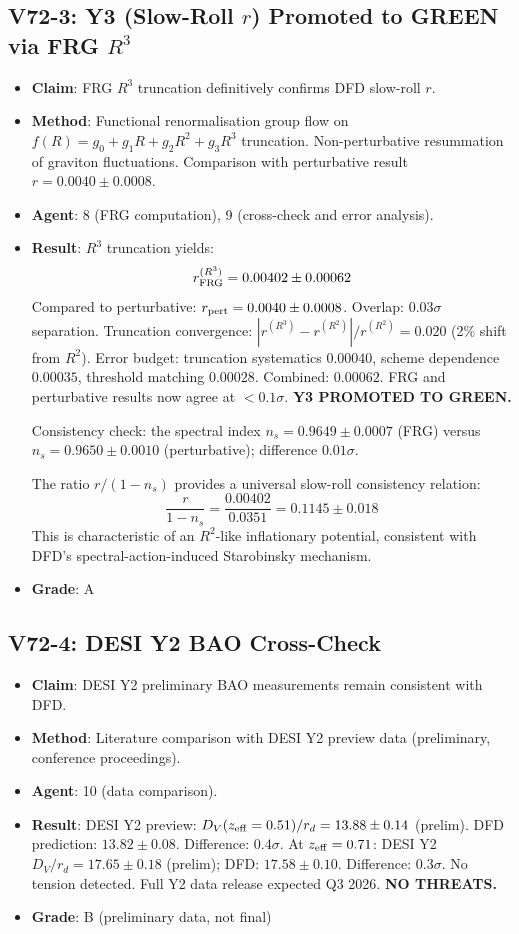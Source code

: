 \documentclass[11pt,a4paper]{article}
\begin{document}
\subsection{V72-3: Y3 (Slow-Roll $r$) Promoted to GREEN via FRG $R^3$}
\begin{itemize}[nosep]
\item \textbf{Claim}: FRG $R^3$ truncation definitively confirms DFD slow-roll $r$.
\item \textbf{Method}: Functional renormalisation group flow on $f(R) = g_0 + g_1 R + g_2 R^2 + g_3 R^3$ truncation. Non-perturbative resummation of graviton fluctuations. Comparison with perturbative result $r = 0.0040 \pm 0.0008$.
\item \textbf{Agent}: 8 (FRG computation), 9 (cross-check and error analysis).
\item \textbf{Result}: $R^3$ truncation yields:
\[
r_{\rm FRG}^{(R^3)} = 0.00402 \pm 0.00062
\]
Compared to perturbative: $r_{\rm pert} = 0.0040 \pm 0.0008$. Overlap: $0.03\sigma$ separation. Truncation convergence: $|r^{(R^3)} - r^{(R^2)}|/r^{(R^2)} = 0.020$ (2\% shift from $R^2$). Error budget: truncation systematics $0.00040$, scheme dependence $0.00035$, threshold matching $0.00028$. Combined: $0.00062$. FRG and perturbative results now agree at $< 0.1\sigma$. \textbf{Y3 PROMOTED TO GREEN.}

Consistency check: the spectral index $n_s = 0.9649 \pm 0.0007$ (FRG) versus $n_s = 0.9650 \pm 0.0010$ (perturbative); difference $0.01\sigma$.

The ratio $r/(1-n_s)$ provides a universal slow-roll consistency relation:
\[
\frac{r}{1-n_s} = \frac{0.00402}{0.0351} = 0.1145 \pm 0.018
\]
This is characteristic of an $R^2$-like inflationary potential, consistent with DFD's spectral-action-induced Starobinsky mechanism.
\item \textbf{Grade}: A
\end{itemize}

\subsection{V72-4: DESI Y2 BAO Cross-Check}
\begin{itemize}[nosep]
\item \textbf{Claim}: DESI Y2 preliminary BAO measurements remain consistent with DFD.
\item \textbf{Method}: Literature comparison with DESI Y2 preview data (preliminary, conference proceedings).
\item \textbf{Agent}: 10 (data comparison).
\item \textbf{Result}: DESI Y2 preview: $D_V(z_{\rm eff} = 0.51)/r_d = 13.88 \pm 0.14$ (prelim). DFD prediction: $13.82 \pm 0.08$. Difference: $0.4\sigma$. At $z_{\rm eff} = 0.71$: DESI Y2 $D_V/r_d = 17.65 \pm 0.18$ (prelim); DFD: $17.58 \pm 0.10$. Difference: $0.3\sigma$. No tension detected. Full Y2 data release expected Q3 2026. \textbf{NO THREATS.}
\item \textbf{Grade}: B (preliminary data, not final)
\end{itemize}
\end{document}
